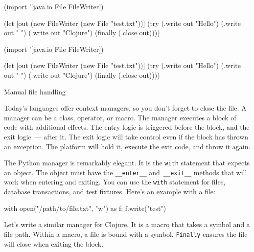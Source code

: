 \begin{listing}[ht!]

\ifx\DEVICETYPE\MOBILE

\begin{clojure}
(import '[java.io File FileWriter])

(let [out (new FileWriter
            (new File "test.txt"))]
  (try
    (.write out "Hello")
    (.write out " ")
    (.write out "Clojure")
    (finally
      (.close out))))
\end{clojure}

\else

\begin{clojure}
(import '[java.io File FileWriter])

(let [out (new FileWriter (new File "test.txt"))]
  (try
    (.write out "Hello")
    (.write out " ")
    (.write out "Clojure")
    (finally
      (.close out))))
\end{clojure}

\fi

\caption{Manual file handling}
\label{fig:write-file}

\end{listing}

Today's languages offer context managers, so you don't forget to close the file. A manager can be a class, operator, or macro.
The manager executes a block of code with additional effects. The entry logic is triggered before the block, and the exit logic~--- after it. The exit logic will take control even if the block has thrown an exception.
The platform will hold it, execute the exit code, and throw it again.


The Python manager is remarkably elegant. It is the \verb|with| statement that expects an object. The object must have the \verb|__enter__| and~\verb|__exit__| methods that will work when entering and exiting. You can use the \verb|with| statement for files, database transactions, and test fixtures. Here's an example with a file:


\begin{python}
with open("/path/to/file.txt", "w") as f:
    f.write("test")
\end{python}

Let's write a similar manager for Clojure. It is a macro that takes a symbol and a file path. Within a macro, a file is bound with a symbol. \verb|Finally| ensures the file will close when exiting the block.

